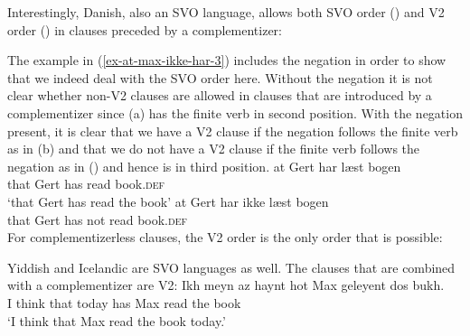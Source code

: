 Interestingly, Danish, also an SVO language, allows both SVO order () and V2 order () in clauses
preceded by a complementizer:
\z

\eal
{}
\zl
The example in (\ref{ex-at-max-ikke-har-3}) includes the negation in order to show that we indeed deal
with the SVO order here. Without the negation it is not clear whether non-V2 clauses are allowed in
clauses that are introduced by a complementizer since (a) has the finite verb in second
position. With the negation present, it is clear that we have a V2 clause if the negation follows
the finite verb as in (b) and that we do not have a V2 clause if the finite verb follows the negation as in
() and hence is in third position.
\eal
\settowidth{}
\ex 
\gll at Gert har læst bogen\\
     that Gert has read book.\textsc{def}\\
\glt `that Gert has read the book'
\ex 
\gll at   Gert har ikke læst bogen\\
     that Gert has not  read book.\textsc{def}\\
\zl 
For complementizerless clauses, the V2 order is the only order that is possible:
\eal
\settowidth{}
\zl 


Yiddish and Icelandic are SVO languages as well. The clauses that are combined with a
complementizer are V2:
\eal
\ex
\gll Ikh meyn  az   haynt hot Max geleyent dos bukh.\footnotemark\\
     I think that today has Max read the book\\\yiddish
{}
\glt `I think that Max read the book today.'

